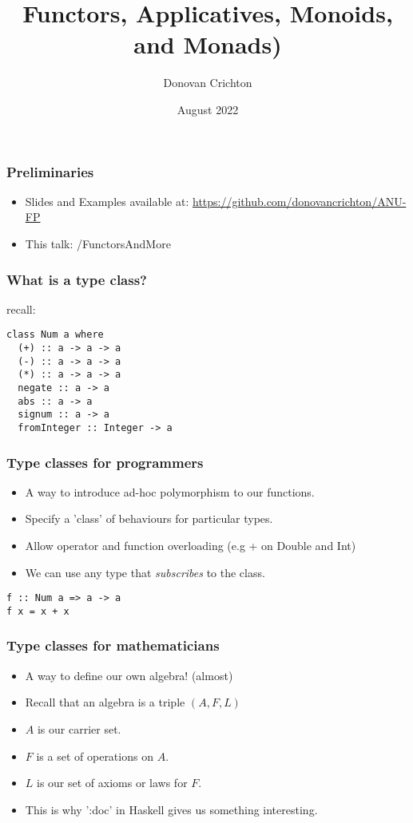 \documentclass[hyperref={colorlinks = true,linkcolor = blue, citecolor = blue, urlcolor = blue}]{beamer}
\title{Functors, Applicatives, Monoids, and Monads)}
\author{Donovan Crichton}
\date{August 2022}
\begin{document}
 
\frame{\titlepage}

\begin{frame}[fragile]
  \frametitle{Preliminaries}
  \begin{itemize}
  \item Slides and Examples available at:
    \url{https://github.com/donovancrichton/ANU-FP}
  \item This talk: /FunctorsAndMore
  \end{itemize}
\end{frame}

\begin{frame}[fragile]
  \frametitle{What is a type class?}
  recall:
  \begin{verbatim}
class Num a where
  (+) :: a -> a -> a
  (-) :: a -> a -> a
  (*) :: a -> a -> a
  negate :: a -> a
  abs :: a -> a
  signum :: a -> a
  fromInteger :: Integer -> a
  \end{verbatim}
\end{frame}

\begin{frame}[fragile]
  \frametitle{Type classes for programmers}
  \begin{itemize}
  \item A way to introduce ad-hoc polymorphism to our functions.
  \item Specify a 'class' of behaviours for particular types.
  \item Allow operator and function overloading (e.g + on Double and Int)
  \item We can use any type that \emph{subscribes} to the class.
  \end{itemize}
  \begin{verbatim}
f :: Num a => a -> a
f x = x + x
  \end{verbatim}

\end{frame}

\begin{frame}[fragile]
  \frametitle{Type classes for mathematicians}
  \begin{itemize}
  \item A way to define our own algebra! (almost)
  \item Recall that an algebra is a triple $(A, F, L)$
  \item $A$ is our carrier set.
  \item $F$ is a set of operations on $A$.
  \item $L$ is our set of axioms or laws for $F$.
  \item This is why ':doc' in Haskell gives us something interesting.
  \end{itemize}
\end{frame}
\end{document}
